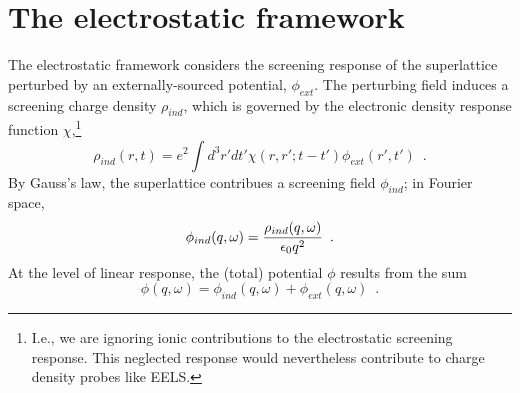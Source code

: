 \section{The electrostatic framework}
\label{section: electrostatic framework}

The electrostatic framework considers the screening response of the superlattice perturbed by an externally-sourced potential, $\phi_{ext}$.  The perturbing field induces a screening charge density $\rho_{ind}$, which is governed by the electronic density response function $\chi$,\footnote{I.e., we are ignoring ionic contributions to the electrostatic screening response.  This neglected response would nevertheless contribute to charge density probes like EELS.}
\begin{equation}
    \label{real space chi def}
    \rho_{ind}(r,t) = e^2\int d^3 r' dt' \chi(r,r';t-t')\phi_{ext}(r',t')
    \,\,\,.
\end{equation}
By Gauss's law, the superlattice contribues a screening field $\phi_{ind}$; in Fourier space,
\begin{equation}
    \label{Fourier phi ind}
    \phi_{ind}(q,\omega) = \frac{\rho_{ind}(q,\omega)}{\epsilon_0 q^2}
    \,\,\,.
\end{equation}
At the level of linear response, the (total) potential $\phi$ results from the sum
\begin{equation}
    \label{phi def}
    \phi(q,\omega) = \phi_{ind}(q,\omega) + \phi_{ext}(q,\omega)
    \,\,\,.
\end{equation}


